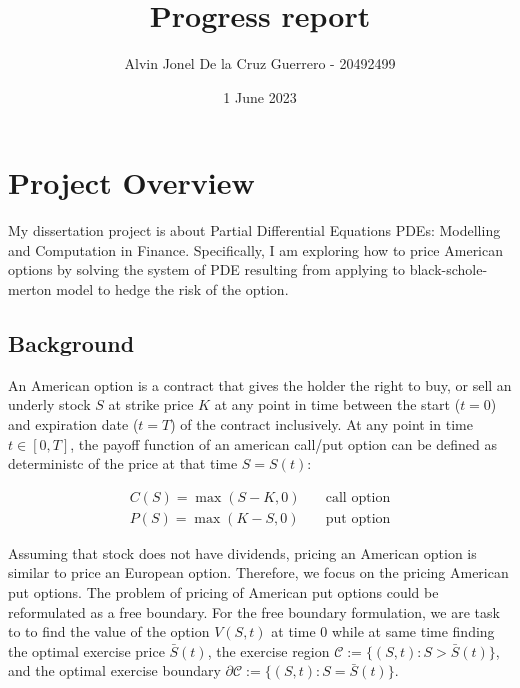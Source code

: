 \documentclass[a4paper,12pt]{article}
\title{Progress report}
\author{Alvin Jonel De la Cruz Guerrero - 20492499}
\date{1 June 2023}
\begin{document}
  \maketitle

  \section{Project Overview}

  My dissertation project is about Partial Differential Equations PDEs: Modelling and 
  Computation in Finance. Specifically, I am exploring how to price American options by 
  solving the system of PDE resulting from applying to black-schole-merton model to hedge
  the risk of the option. 
  
  \subsection{Background}
  An American option is a contract that gives the holder the right to buy, or 
  sell an underly stock $S$ at strike price $K$ at any point in time between the
  start ($t=0$) and expiration date ($t=T$) of the contract inclusively. At any 
  point in time $t \in [0, T]$, the 
  payoff function of an american call/put option can be defined as deterministc
  of the price at that time $S = S(t)$:

  \begin{equation}
    \begin{aligned}
    C(S) = \max(S - K, 0) & \quad \text{call option} \\
    P(S) = \max(K - S, 0) & \quad \text{put option}
    \end{aligned}
  \end{equation}

  Assuming that stock does not have dividends, pricing an American option 
  is similar to price an European option. Therefore, we focus on the pricing 
  American put options. The problem of pricing of American put options could be 
  reformulated as a free boundary. For the free boundary formulation, we are task to
  to find the value of the option $V(S, t)$ at time 0 while at same time finding 
  the optimal exercise price $\bar{S}(t)$, the exercise region 
  $\mathcal{C} := \{(S,t): S > \bar{S}(t)\}$, and the optimal 
  exercise boundary $\partial\mathcal{C} := \{(S,t): S = \bar{S}(t) \}$.
\end{document}
